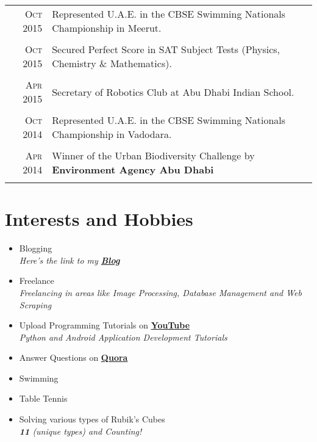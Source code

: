\documentclass[a4paper,10pt]{article}
\begin{document}
\begin{tabular}{r|p{13.7cm}}
\textsc{Oct} 2015 & Represented U.A.E. in the CBSE Swimming Nationals Championship in Meerut.\\\multicolumn{2}{c}{}\\
\textsc{Oct} 2015 & Secured Perfect Score in SAT Subject Tests (Physics, Chemistry \& Mathematics).\\\multicolumn{2}{c}{}\\
\textsc{Apr} 2015 & Secretary of Robotics Club at Abu Dhabi Indian School. \\\multicolumn{2}{c}{}\\
\textsc{Oct} 2014 & Represented U.A.E. in the CBSE Swimming Nationals Championship in Vadodara.  \\\multicolumn{2}{c}{}\\
\textsc{Apr} 2014 & Winner of the Urban Biodiversity Challenge by \textbf{Environment Agency Abu Dhabi} \\\multicolumn{2}{c}{}\\
\end{tabular}




\section{Interests and Hobbies}
\begin{itemize}
  \item Blogging \\
  \emph{\small{Here's the link to my \href{https://medium.com/@yashitmaheshwary}{\textbf{Blog}}}}
  \item Freelance \\
  \emph{\small{Freelancing in areas like Image Processing, Database Management and Web Scraping}}
  \item Upload Programming Tutorials on \href{https://www.youtube.com/channel/UC5A8roRFNDmhw4jNKiQqWnQ}{\textbf{YouTube}} \\
  \emph{\small{Python and Android Application Development Tutorials}}
  \item Answer Questions on \href{https://www.quora.com/profile/Yashit-Maheshwary}{\textbf{Quora}}
  \item Swimming
  \item Table Tennis
  \item Solving various types of Rubik's Cubes \\
  \emph{\normalsize{\textbf{11}} \small{(unique types) and Counting!}}
\end{itemize}
\end{document}
